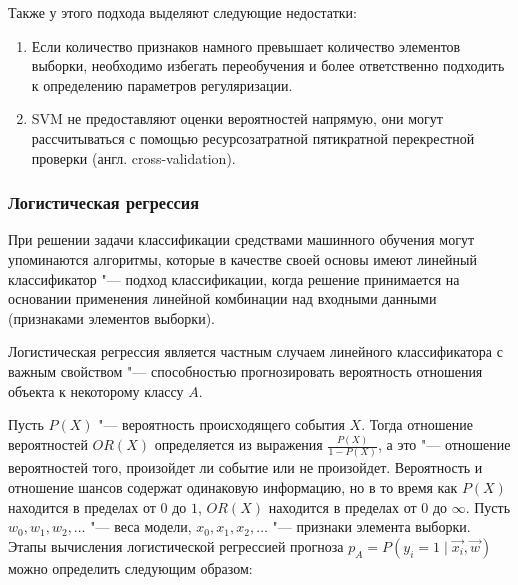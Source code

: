 \documentclass[bachelor, och, coursework]{SCWorks}
\begin{document}
            Также у этого подхода выделяют следующие недостатки:

            \begin{enumerate}
                \item Если количество признаков намного превышает количество
                элементов выборки, необходимо избегать переобучения и более
                ответственно подходить к определению параметров регуляризации.
                \item SVM не предоставляют оценки вероятностей напрямую, они
                могут рассчитываться с помощью ресурсозатратной пятикратной
                перекрестной проверки (англ. cross-validation).
            \end{enumerate}

        \subsubsection{Логистическая регрессия}

            При решении задачи классификации средствами машинного обучения могут
            упоминаются алгоритмы, которые в качестве своей основы имеют
            линейный классификатор "--- подход классификации, когда решение
            принимается на основании применения линейной комбинации над входными
            данными (признаками элементов выборки).

            Логистическая регрессия является частным случаем линейного
            классификатора с важным свойством "--- способностью прогнозировать
            вероятность отношения объекта к некоторому классу $A$. \cite{logreg}

            Пусть $P(X)$ "--- вероятность происходящего события $X$. Тогда
            отношение вероятностей $OR(X)$ определяется из выражения
            $\frac{P(X)}{1 - P(X)}$, а это "--- отношение вероятностей того,
            произойдет ли событие или не произойдет. Вероятность и отношение
            шансов содержат одинаковую информацию, но в то время как $P(X)$
            находится в пределах от $0$ до $1$, $OR(X)$ находится в пределах от
            $0$ до $\infty$. Пусть $w_0, w_1, w_2, \dots$ "--- веса модели,
            $x_0, x_1, x_2, \dots$ "--- признаки элемента выборки. Этапы
            вычисления логистической регрессией прогноза $p_A = P\left(y_i = 1
            \mid \vec{x_i}, \vec{w}\right)$ можно определить следующим образом:
\end{document}
